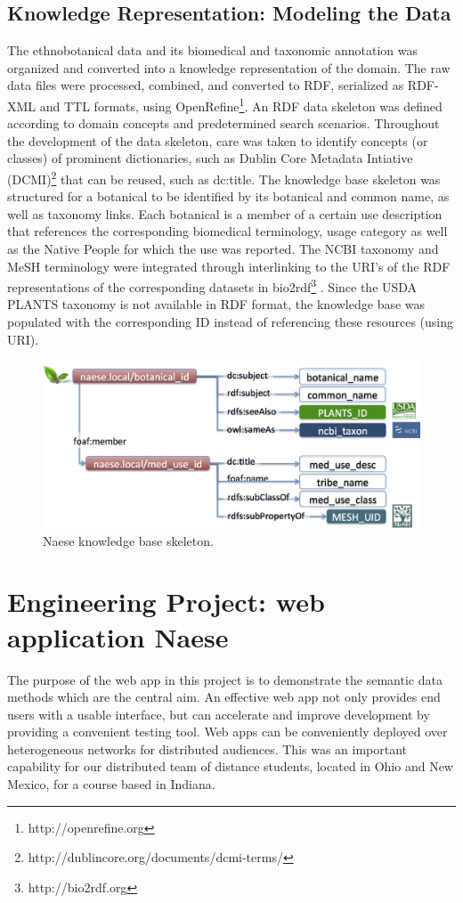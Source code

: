 \documentclass{acm_proc_article-sp}
\begin{document}
\subsection{Knowledge Representation: Modeling the Data}
The ethnobotanical data and its biomedical and taxonomic annotation was organized and converted into a knowledge representation of the domain. The raw data files were processed, combined, and converted to RDF, serialized as RDF-XML and TTL formats, using OpenRefine\footnote{http://openrefine.org}. An RDF data skeleton was defined according to domain concepts and predetermined search scenarios. Throughout the development of the data skeleton, care was taken to identify concepts (or classes) of prominent dictionaries, such as Dublin Core Metadata Intiative (DCMI)\footnote{http://dublincore.org/documents/dcmi-terms/} that can be reused, such as dc:title. The knowledge base skeleton was structured for a botanical to be identified by its botanical and common name, as well as taxonomy links. Each botanical is a member of a certain use description that references the corresponding biomedical terminology, usage category as well as the Native People for which the use was reported. The NCBI taxonomy and MeSH terminology were integrated through interlinking to the URI's of the RDF representations of the corresponding datasets in bio2rdf\footnote{http://bio2rdf.org} \cite{Belleau:2008}. Since the USDA PLANTS taxonomy is not available in RDF format, the knowledge base was populated with the corresponding ID instead of referencing these resources (using URI).

\begin{figure}
	\includegraphics[width=\linewidth]{RDF_skeleton_naese}
	\caption{Naese knowledge base skeleton.}
	\label{fig:NaeseSkeleton}
\end{figure}

\section{Engineering Project: web application Naese}
The purpose of the web app in this project is to demonstrate the semantic data methods which are the central aim. An effective web app not only provides end users with a usable interface, but can accelerate and improve development by providing a convenient testing tool. Web apps can be conveniently deployed over heterogeneous networks for distributed audiences. This was an important capability for our distributed team of distance students, located in Ohio and New Mexico, for a course based in Indiana.
\end{document}
